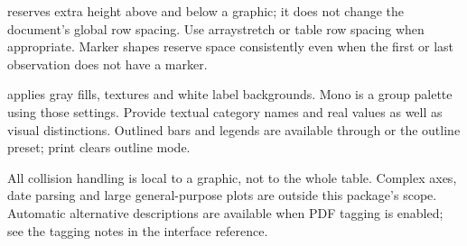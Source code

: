  reserves extra height above and below a graphic; it does not
change the document's global row spacing. Use arraystretch or table row spacing
when appropriate. Marker shapes reserve space consistently even when the first
or last observation does not have a marker.

 applies gray fills, textures and white label backgrounds. Mono is a
group palette using those settings. Provide textual category names and real values
as well as visual distinctions. Outlined bars and legends are available through
 or the outline preset; print clears outline mode.

All collision handling is local to a graphic, not to the whole table. Complex
axes, date parsing and large general-purpose plots are outside this package's
scope. Automatic alternative descriptions are available when PDF tagging is enabled;
see the tagging notes in the interface reference.
